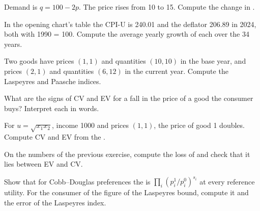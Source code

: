 \begin{exercise}[$\star$]\label{exo:b1:consumer-welfare:cs-linear}
Demand is $q = 100 - 2p$. The price rises from 10 to 15. Compute the change
in .
\end{exercise}

\begin{exercise}[$\star$]\label{exo:b1:consumer-welfare:growth}
In the opening chart's table the CPI-U is 240.01 and the deflator 206.89 in
2024, both with 1990 = 100. %
Compute the average yearly growth of each over the 34 years.
\end{exercise}

\begin{exercise}[$\star$]\label{exo:b1:consumer-welfare:lp}
Two goods have prices $(1, 1)$ and quantities $(10, 10)$ in the base year, and
prices $(2, 1)$ and quantities $(6, 12)$ in the current year. Compute the
Laspeyres and Paasche indices.
\end{exercise}

\begin{exercise}[$\star$]\label{exo:b1:consumer-welfare:signs}
What are the signs of CV and EV for a fall in the price of a good the
consumer buys? Interpret each in words.
\end{exercise}

\begin{exercise}[$\star\star$]\label{exo:b1:consumer-welfare:cv-ev}
For $u = \sqrt{x_1x_2}$, income 1000 and prices $(1, 1)$, the price of good 1
doubles. Compute CV and EV from the .
\end{exercise}

\begin{exercise}[$\star\star$]\label{exo:b1:consumer-welfare:between}
On the numbers of the previous exercise, compute the loss of  and check that it lies between EV and CV.
\end{exercise}

\begin{exercise}[$\star\star$]\label{exo:b1:consumer-welfare:cd-index}
Show that for Cobb--Douglas preferences the  is
$\prod_i(p^1_i/p^0_i)^{s_i}$ at every reference utility. For the consumer of
the figure of the Laspeyres bound, compute it and the error of the
Laspeyres index.
\end{exercise}

